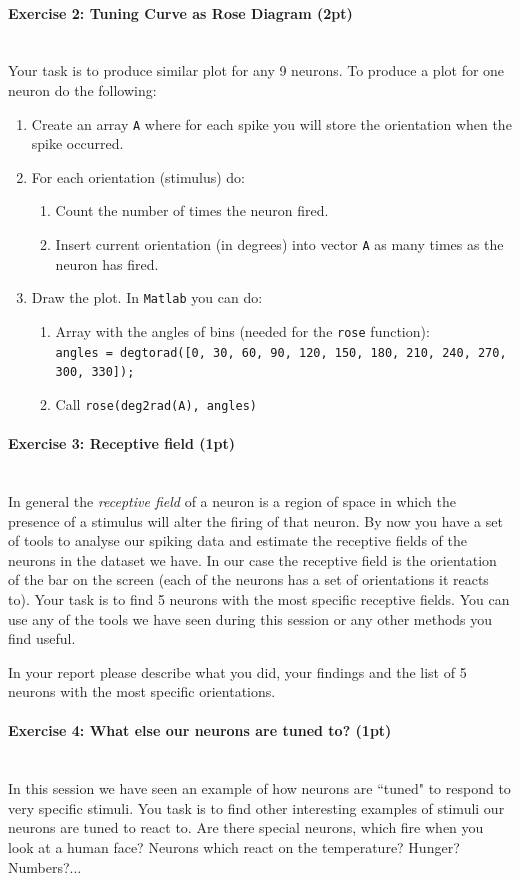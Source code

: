 \documentclass[a4paper,11pt]{article}
\newenvironment{exercise}[3]{\paragraph{Exercise #1: #2 (#3pt)}\ \\}{
\medskip}
\begin{document}
\begin{exercise}{2}{Tuning Curve as Rose Diagram}{2}
Your task is to produce similar plot for any 9 neurons. To produce a plot for one neuron do the following:
\begin{enumerate}
	\item Create an array \texttt{A} where for each spike you will store the orientation when the spike occurred.
	\item For each orientation (stimulus) do:
	\begin{enumerate}
		\item Count the number of times the neuron fired.
		\item Insert current orientation (in degrees) into vector \texttt{A} as many times as the neuron has fired.
	\end{enumerate}
	\item Draw the plot. In \texttt{Matlab} you can do:
	\begin{enumerate}
		\item Array with the angles of bins (needed for the \texttt{rose} function):\\ \texttt{angles = degtorad([0, 30, 60, 90, 120, 150, 180, 210, 240, 270, 300, 330]);}
		\item Call \texttt{rose(deg2rad(A), angles)}
	\end{enumerate}
\end{enumerate}
\end{exercise}


\begin{exercise}{3}{Receptive field}{1}
In general the \emph{receptive field} of a neuron is a region of space in which the presence of a stimulus will alter the firing of that neuron. By now you have a set of tools to analyse our spiking data and estimate the receptive fields of the neurons in the dataset we have. In our case the receptive field is the orientation of the bar on the screen (each of the neurons has a set of orientations it reacts to). Your task is to find 5 neurons with the most specific receptive fields. You can use any of the tools we have seen during this session or any other methods you find useful.

In your report please describe what you did, your findings and the list of 5 neurons with the most specific orientations.
\end{exercise}


\begin{exercise}{4}{What else our neurons are tuned to?}{1}
In this session we have seen an example of how neurons are ``tuned" to respond to very specific stimuli. You task is to find  other interesting examples of stimuli our neurons are tuned to react to. Are there special neurons, which fire when you look at a human face? Neurons which react on the temperature? Hunger? Numbers?...
\end{exercise}
\end{document}
